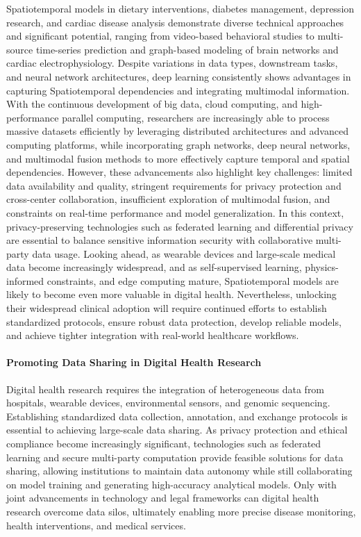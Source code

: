 \documentclass[acmsmall]{acmart}
\begin{document}
Spatiotemporal models in dietary interventions, diabetes management, depression research, and cardiac disease analysis demonstrate diverse technical approaches and significant potential, ranging from video-based behavioral studies to multi-source time-series prediction and graph-based modeling of brain networks and cardiac electrophysiology. Despite variations in data types, downstream tasks, and neural network architectures, deep learning consistently shows advantages in capturing Spatiotemporal dependencies and integrating multimodal information. With the continuous development of big data, cloud computing, and high-performance parallel computing, researchers are increasingly able to process massive datasets efficiently by leveraging distributed architectures and advanced computing platforms, while incorporating graph networks, deep neural networks, and multimodal fusion methods to more effectively capture temporal and spatial dependencies. However, these advancements also highlight key challenges: limited data availability and quality, stringent requirements for privacy protection and cross-center collaboration, insufficient exploration of multimodal fusion, and constraints on real-time performance and model generalization. In this context, privacy-preserving technologies such as federated learning and differential privacy are essential to balance sensitive information security with collaborative multi-party data usage. Looking ahead, as wearable devices and large-scale medical data become increasingly widespread, and as self-supervised learning, physics-informed constraints, and edge computing mature, Spatiotemporal models are likely to become even more valuable in digital health. Nevertheless, unlocking their widespread clinical adoption will require continued efforts to establish standardized protocols, ensure robust data protection, develop reliable models, and achieve tighter integration with real-world healthcare workflows.
\paragraph{Promoting Data Sharing in Digital Health Research}
Digital health research requires the integration of heterogeneous data from hospitals, wearable devices, environmental sensors, and genomic sequencing. Establishing standardized data collection, annotation, and exchange protocols is essential to achieving large-scale data sharing. As privacy protection and ethical compliance become increasingly significant, technologies such as federated learning and secure multi-party computation provide feasible solutions for data sharing, allowing institutions to maintain data autonomy while still collaborating on model training and generating high-accuracy analytical models. Only with joint advancements in technology and legal frameworks can digital health research overcome data silos, ultimately enabling more precise disease monitoring, health interventions, and medical services.
\end{document}
